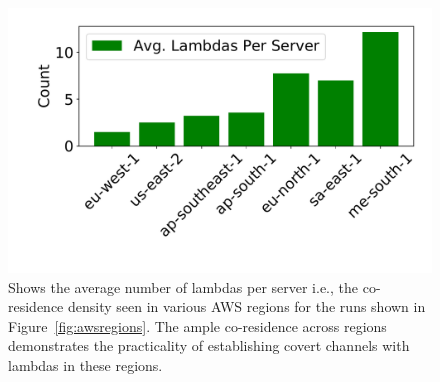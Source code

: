 \begin{figure}[!t]
  \includegraphics[width=.99\linewidth]{fig/density.pdf}
  \caption{Shows the average number of lambdas per server i.e., the co-residence 
  density seen in various AWS regions for the runs shown in Figure~\ref{fig:awsregions}. 
  The ample co-residence across regions demonstrates the practicality of establishing 
  covert channels with lambdas in these regions.
\label{fig:density}}
\end{figure}

